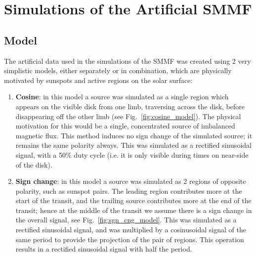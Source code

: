 \chapter{Simulations of the Artificial SMMF}\label{app:SMMF_sims}


\section{Model}

The artificial data used in the simulations of the SMMF was created using 2 very simplistic models, either separately or in combination, which are physically motivated by sunspots and active regions on the solar surface:

\begin{enumerate}
	
	\item{{\bf Cosine}: in this model a source was simulated as a single region which appears on the visible disk from one limb, traversing across the disk, before disappearing off the other limb (see Fig.~\ref{fig:cosine_model}). The physical motivation for this would be a single, concentrated source of imbalanced magnetic flux. This method induces no sign change of the simulated source; it remains the same polarity always. This was simulated as a rectified sinusoidal signal, with a 50$\%$ duty cycle (i.e. it is only visible during times on near-side of the disk).}
	
	\item{{\bf Sign change}: in this model a source was simulated as 2 regions of opposite polarity, such as sunspot pairs. The leading region contributes more at the start of the transit, and the trailing source contributes more at the end of the transit; hence at the middle of the transit we assume there is a sign change in the overall signal, see Fig.~\ref{fig:sgn_cng_model}. This was simulated as a rectified sinusoidal signal, and was multiplied by a cosinusoidal signal of the same period to provide the projection of the pair of regions. This operation results in a rectified sinusoidal signal with half the period.}
	
\end{enumerate}

